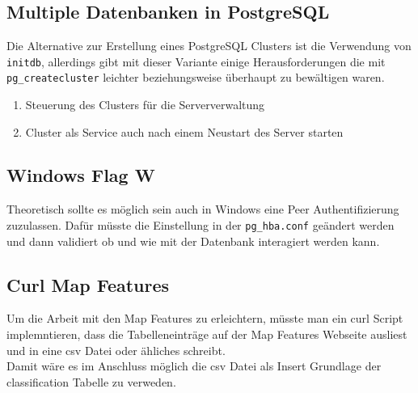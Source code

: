 \setcounter{page}{1} 
\part{\appendixname}
\appendix
\ihead{} \chead{} \ohead{} \ifoot{} \cfoot{\pagemark} \ofoot{}

\newpage
\setheadsepline{.5px}
\setfootsepline{.5px}
\ohead{\headmark}
\chapter{Multiple Datenbanken in PostgreSQL}\label{ch:clustering}
Die Alternative zur Erstellung eines PostgreSQL Clusters ist die Verwendung von \lstinline[language=bash]|initdb|\cite{postgresql-cluster}, allerdings gibt mit dieser Variante einige Herausforderungen die mit \lstinline[language=bash]|pg_createcluster| leichter beziehungsweise überhaupt zu bewältigen waren.
\begin{enumerate}
	\item Steuerung des Clusters für die Serververwaltung
	\item Cluster als Service auch nach einem Neustart des Server starten
\end{enumerate}

\chapter{Windows Flag W}\label{ap:ch:win-pass}
Theoretisch sollte es möglich sein auch in Windows eine Peer Authentifizierung zuzulassen. Dafür müsste die Einstellung in der \lstinline|pg_hba.conf| geändert werden und dann validiert ob und wie mit der Datenbank interagiert werden kann.

\chapter{Curl Map Features}\label{ap:ch:curl-mapfeatures}
Um die Arbeit mit den Map Features\cite{osm-mapfeatures} zu erleichtern, müsste man ein curl Script implemntieren, dass die Tabelleneinträge auf der Map Features Webseite ausliest und in eine csv Datei oder ähliches schreibt.\\

\noindent Damit wäre es im Anschluss möglich die csv Datei als Insert Grundlage der classification Tabelle zu verweden.
